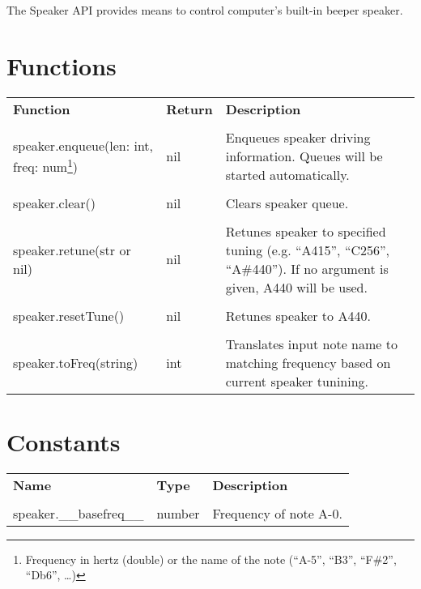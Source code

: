 The Speaker API provides means to control computer's built-in beeper speaker.

\section{Functions}

\begin{tabularx}{\textwidth}{l l X}
	\textbf{\large Function} & \textbf{\large Return} & \textbf{\large Description}
	\\ \\
	\endhead
	speaker.enqueue(len: int, freq: num\footnote{Frequency in hertz (double) or the name of the note (``A-5'', ``B3'', ``F\#2'', ``Db6'', \ldots)}) & nil & Enqueues speaker driving information. Queues will be started automatically.
	\\ \\
	speaker.clear() & nil & Clears speaker queue.
	\\ \\
	speaker.retune(str or nil) & nil & Retunes speaker to specified tuning (e.g. ``A415'', ``C256'', ``A\#440''). If no argument is given, A440 will be used.
	\\ \\
	speaker.resetTune() & nil & Retunes speaker to A440.
	\\ \\
	speaker.toFreq(string) & int & Translates input note name to matching frequency based on current speaker tunining.
\end{tabularx}

\section{Constants}

\begin{tabularx}{\textwidth}{l l X}
	\textbf{\large Name} & \textbf{\large Type} & \textbf{\large Description}
	\\ \\
	\endhead
	speaker.\_\_basefreq\_\_ & number & Frequency of note A-0.
\end{tabularx}